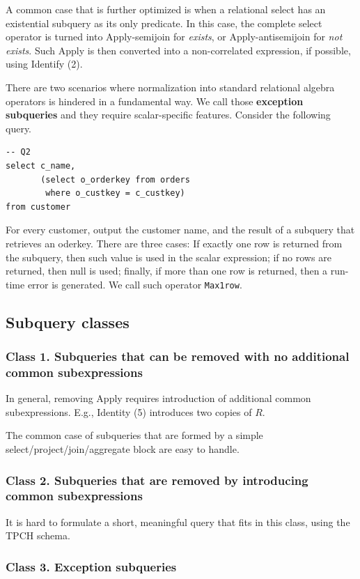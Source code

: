 \documentclass[11pt]{article}
\begin{document}
A common case that is further optimized is when a relational select has an existential subquery as its
only predicate. In this case, the complete select operator is turned into Apply-semijoin for \emph{exists},
or Apply-antisemijoin for \emph{not exists}. Such Apply is then converted into a non-correlated expression,
if possible, using Identify (2).

There are two scenarios where normalization into standard relational algebra operators is hindered in
a fundamental way. We call those \textbf{exception subqueries} and they require scalar-specific features.
Consider the following query.
\begin{verbatim}
-- Q2
select c_name,
       (select o_orderkey from orders
        where o_custkey = c_custkey)
from customer
\end{verbatim}

For every customer, output the customer name, and the result of a subquery that retrieves an oderkey.
There are three cases: If exactly one row is returned from the subquery, then such value is used in
the scalar expression; if no rows are returned, then null is used; finally, if more than one row is
returned, then a run-time error is generated. We call such operator \texttt{Max1row}.
\subsection{Subquery classes}
\label{sec:org2be17e6}
\subsubsection{Class 1. Subqueries that can be removed with no additional common subexpressions}
\label{sec:org2591474}
In general, removing Apply requires introduction of additional common subexpressions. E.g., Identity
(5) introduces two copies of \(R\).

The common case of subqueries that are formed by a simple select/project/join/aggregate block are easy
to handle.
\subsubsection{Class 2. Subqueries that are removed by introducing common subexpressions}
\label{sec:org2d4aee7}
It is hard to formulate a short, meaningful query that fits in this class, using the TPCH schema.
\subsubsection{Class 3. Exception subqueries}
\label{sec:org88fe12c}
\end{document}
